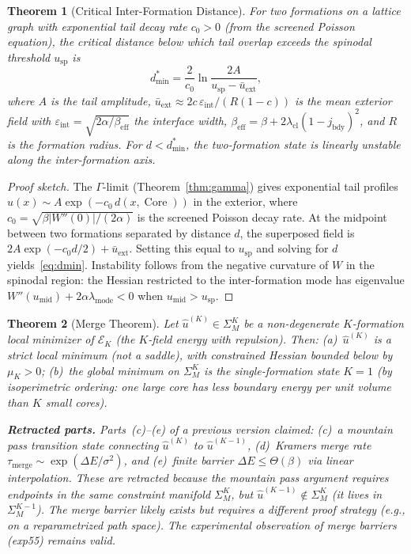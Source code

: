 \documentclass[lettersize,journal]{IEEEtran}
\newtheorem{theorem}{Theorem}
\DeclareMathOperator{\Core}{Core}
\begin{document}
\begin{theorem}[Critical Inter-Formation Distance]
\label{thm:dmin-formula}
For two formations on a lattice graph with exponential tail decay rate $c_0 > 0$ (from the screened Poisson equation), the critical distance below which tail overlap exceeds the spinodal threshold $u_{\mathrm{sp}}$ is
\begin{equation}
\label{eq:dmin}
d_{\min}^* = \frac{2}{c_0}\ln\!\frac{2A}{u_{\mathrm{sp}} - \bar{u}_{\mathrm{ext}}},
\end{equation}
where $A$ is the tail amplitude, $\bar{u}_{\mathrm{ext}} \approx 2c\,\varepsilon_{\mathrm{int}} / (R(1-c))$ is the mean exterior field with $\varepsilon_{\mathrm{int}} = \sqrt{2\alpha/\beta_{\mathrm{eff}}}$ the interface width, $\beta_{\mathrm{eff}} = \beta + 2\lambda_{\mathrm{cl}}(1-j_{\mathrm{bdy}})^2$, and $R$ is the formation radius. For $d < d_{\min}^*$, the two-formation state is linearly unstable along the inter-formation axis.
\end{theorem}

\begin{proof}[Proof sketch]
The $\Gamma$-limit (Theorem~\ref{thm:gamma}) gives exponential tail profiles $u(x) \sim A\exp(-c_0 \,d(x,\Core))$ in the exterior, where $c_0 = \sqrt{\beta|W''(0)|/(2\alpha)}$ is the screened Poisson decay rate. At the midpoint between two formations separated by distance $d$, the superposed field is $2A\exp(-c_0 d/2) + \bar{u}_{\mathrm{ext}}$. Setting this equal to $u_{\mathrm{sp}}$ and solving for $d$ yields~\eqref{eq:dmin}. Instability follows from the negative curvature of $W$ in the spinodal region: the Hessian restricted to the inter-formation mode has eigenvalue $W''(u_{\mathrm{mid}}) + 2\alpha\lambda_{\mathrm{mode}} < 0$ when $u_{\mathrm{mid}} > u_{\mathrm{sp}}$.
\end{proof}

\begin{theorem}[Merge Theorem]
\label{thm:merge}
Let $\hat{u}^{(K)} \in \Sigma^K_M$ be a non-degenerate $K$-formation local minimizer of $\mathcal{E}_K$ (the $K$-field energy with repulsion). Then: (a)~$\hat{u}^{(K)}$ is a strict local minimum (not a saddle), with constrained Hessian bounded below by $\mu_K > 0$; (b)~the global minimum on $\Sigma^K_M$ is the single-formation state $K=1$ (by isoperimetric ordering: one large core has less boundary energy per unit volume than $K$ small cores).

\smallskip\noindent\textbf{Retracted parts.} Parts~(c)--(e) of a previous version claimed: (c)~a mountain pass transition state connecting $\hat{u}^{(K)}$ to $\hat{u}^{(K-1)}$, (d)~Kramers merge rate $\tau_{\mathrm{merge}} \sim \exp(\Delta E/\sigma^2)$, and (e)~finite barrier $\Delta E \leq \Theta(\beta)$ via linear interpolation. These are retracted because the mountain pass argument requires endpoints in the same constraint manifold $\Sigma^K_M$, but $\hat{u}^{(K-1)} \notin \Sigma^K_M$ (it lives in $\Sigma^{K-1}_M$). The merge barrier likely exists but requires a different proof strategy (e.g., on a reparametrized path space). The experimental observation of merge barriers (exp55) remains valid.
\end{theorem}
\end{document}
